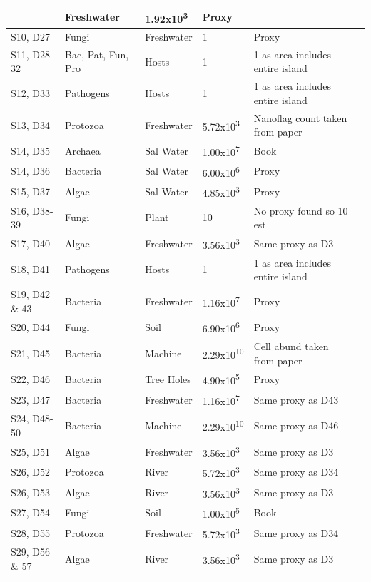 \begin{table}[h]
\begin{tabular}{  l  p{2cm} p{2cm}  p{1.5cm} p{5cm} p{5cm}}
&Freshwater 
& 1.92x10\textsuperscript{3}      
& Proxy \cite{olive2020control} \\\hline
S10, D27
&Fungi
&Freshwater
& 1         
& Proxy \cite{wurzbacher2010fungi} \\\hline
S11, D28-32
&Bac, Pat, Fun, Pro
&Hosts
& 1            
& 1 as area includes entire island \\\hline
S12, D33
&Pathogens
&Hosts
& 1        
& 1 as area includes entire island \\\hline
S13, D34
&Protozoa
&Freshwater 
& 5.72x10\textsuperscript{3} 
& Nanoflag count taken from paper \\\hline
S14, D35
&Archaea
&Sal Water
& 1.00x10\textsuperscript{7} 
& Book \cite{kulkarni2019alkaliphiles} \\\hline
S14, D36
&Bacteria
&Sal Water 
& 6.00x10\textsuperscript{6} 
& Proxy \cite{humayoun2003depth} \\\hline
S15, D37
&Algae
&Sal Water
& 4.85x10\textsuperscript{3} 
& Proxy \cite{rengefors2008marine} \\\hline
S16, D38-39
&Fungi
&Plant
& 10       
& No proxy found so 10 est \\\hline
S17, D40
&Algae
&Freshwater
& 3.56x10\textsuperscript{3}   
& Same proxy as D3 \\\hline
S18, D41
&Pathogens
&Hosts
& 1     
& 1 as area includes entire island \\\hline
S19, D42 \& 43
&Bacteria
&Freshwater
& 1.16x10\textsuperscript{7} 
& Proxy \cite{cole1993bacterial} \\\hline
S20, D44
&Fungi
&Soil
& 6.90x10\textsuperscript{6} 
& Proxy \cite{prevost2011validation} \\\hline
S21, D45
&Bacteria
&Machine
& 2.29x10\textsuperscript{10} 
& Cell abund taken from paper \\\hline
S22, D46
&Bacteria
&Tree Holes
& 4.90x10\textsuperscript{5} 
& Proxy \cite{rivett2018abundance} \\\hline
S23, D47
&Bacteria
&Freshwater
& 1.16x10\textsuperscript{7} 
& Same proxy as D43 \\\hline
S24, D48-50
&Bacteria
&Machine
& 2.29x10\textsuperscript{10}  
& Same proxy as D46 \\\hline
S25, D51
&Algae
&Freshwater
& 3.56x10\textsuperscript{3}    
& Same proxy as D3 \\\hline
S26, D52
&Protozoa
&River
& 5.72x10\textsuperscript{3} 
& Same proxy as D34 \\\hline
S26, D53
&Algae
&River
& 3.56x10\textsuperscript{3}    
& Same proxy as D3 \\\hline
S27, D54
&Fungi
&Soil
& 1.00x10\textsuperscript{5} 
& Book \cite{pepper2019biotic} \\\hline
S28, D55
&Protozoa
&Freshwater
& 5.72x10\textsuperscript{3} 
& Same proxy as D34 \\\hline
S29, D56 \& 57
&Algae
&River 
& 3.56x10\textsuperscript{3}   
& Same proxy as D3 \\
        \bottomrule
    \end{tabular}
\end{table}

